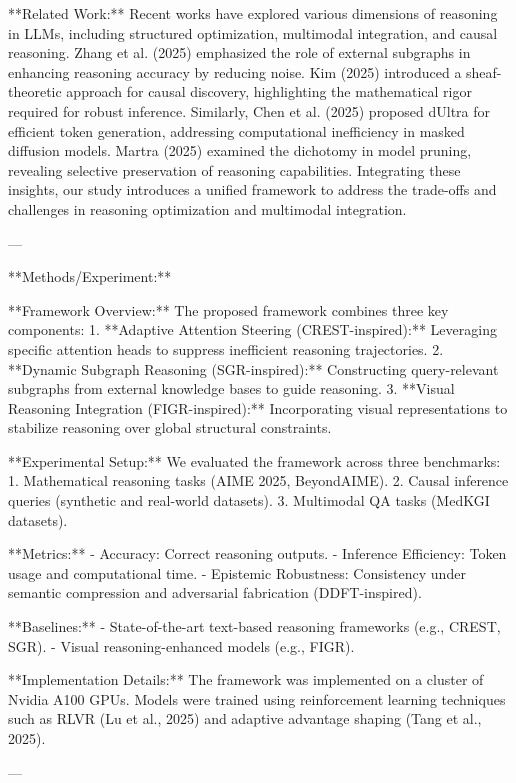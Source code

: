 **Related Work:**  
Recent works have explored various dimensions of reasoning in LLMs, including structured optimization, multimodal integration, and causal reasoning. Zhang et al. (2025) emphasized the role of external subgraphs in enhancing reasoning accuracy by reducing noise. Kim (2025) introduced a sheaf-theoretic approach for causal discovery, highlighting the mathematical rigor required for robust inference. Similarly, Chen et al. (2025) proposed dUltra for efficient token generation, addressing computational inefficiency in masked diffusion models. Martra (2025) examined the dichotomy in model pruning, revealing selective preservation of reasoning capabilities. Integrating these insights, our study introduces a unified framework to address the trade-offs and challenges in reasoning optimization and multimodal integration.

---

**Methods/Experiment:**  

**Framework Overview:**  
The proposed framework combines three key components:  
1. **Adaptive Attention Steering (CREST-inspired):** Leveraging specific attention heads to suppress inefficient reasoning trajectories.  
2. **Dynamic Subgraph Reasoning (SGR-inspired):** Constructing query-relevant subgraphs from external knowledge bases to guide reasoning.  
3. **Visual Reasoning Integration (FIGR-inspired):** Incorporating visual representations to stabilize reasoning over global structural constraints.

**Experimental Setup:**  
We evaluated the framework across three benchmarks:  
1. Mathematical reasoning tasks (AIME 2025, BeyondAIME).  
2. Causal inference queries (synthetic and real-world datasets).  
3. Multimodal QA tasks (MedKGI datasets).

**Metrics:**  
- Accuracy: Correct reasoning outputs.  
- Inference Efficiency: Token usage and computational time.  
- Epistemic Robustness: Consistency under semantic compression and adversarial fabrication (DDFT-inspired).  

**Baselines:**  
- State-of-the-art text-based reasoning frameworks (e.g., CREST, SGR).  
- Visual reasoning-enhanced models (e.g., FIGR).  

**Implementation Details:**  
The framework was implemented on a cluster of Nvidia A100 GPUs. Models were trained using reinforcement learning techniques such as RLVR (Lu et al., 2025) and adaptive advantage shaping (Tang et al., 2025).

---

